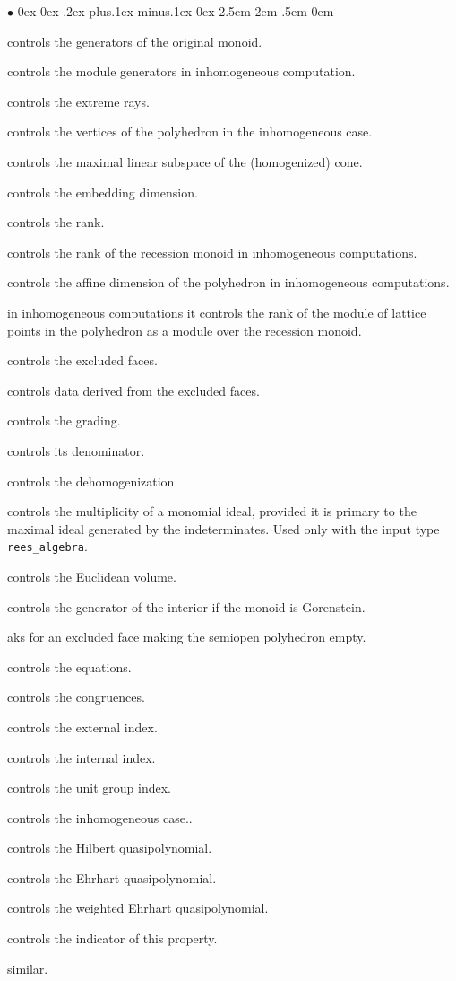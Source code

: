 \documentclass[12pt,a4paper]{scrartcl}
\newcommand{\stdli}{ \topsep0ex \partopsep0ex %
\parsep.2ex plus.1ex minus.1ex \itemsep0ex%
\leftmargin2.5em \labelwidth2em \labelsep.5em \rightmargin0em}%
\renewenvironment{itemize}{\begin{list}{{$\bullet$}}{\stdli}}{\end{list}}
\theoremstyle{definition}
\def\itemtt[#1]{\item[\textbf{\ttt{#1}}]}
\def\ttt{\texttt}
\begin{document}
\begin{itemize}
	
	\itemtt[OriginalMonoidGenerators] controls the generators of the original monoid.
	
	\itemtt[ModuleGenerators] controls the module generators in inhomogeneous computation.
	
	\itemtt[ExtremeRays] controls the extreme rays.
	
	\itemtt[VerticesOfPolyhedron] controls the vertices of the polyhedron in the inhomogeneous case.
	
	\itemtt[MaximalSubspace] controls the maximal linear subspace of the (homogenized) cone.		
	
	\itemtt [EmbeddingDim] controls the embedding dimension.
	\itemtt [Rank] controls the rank.
	
	\itemtt[RecessionRank]  controls the rank of the recession monoid in inhomogeneous computations.
	
	\itemtt[AffineDim]  controls the affine dimension of the polyhedron in inhomogeneous computations.
	
	\itemtt[ModuleRank] in inhomogeneous computations it controls the rank of the module of lattice points in the polyhedron as a module over the recession monoid. 
	
	\itemtt[ExcludedFaces] controls the excluded faces.
	
	\itemtt[InclusionExclusionData] controls data derived from the excluded faces.
	
	\itemtt[Grading] controls the grading.
	\itemtt[GradingDenom] controls its denominator.
	
	\itemtt[Dehomogenization] controls the dehomogenization.
	
	\itemtt[ReesPrimaryMultiplicity] controls the multiplicity of a monomial ideal, provided it is primary to the maximal ideal generated by the indeterminates. Used only with the input type \verb|rees_algebra|.
	
	\itemtt[EuclideanVolume]controls the Euclidean volume.
	
	\itemtt [GeneratorOfInterior] controls  the generator of the interior if the monoid is Gorenstein.
	
	\itemtt [CoveringFace] aks for an excluded face making the semiopen polyhedron empty. 
	
	\itemtt[Equations] controls the equations.
	\itemtt[Congruences] controls the congruences.
	\itemtt[ExternalIndex]  controls the external index.
	\itemtt[InternalIndex]  controls the internal index.
	\itemtt[UnitGroupIndex]  controls the unit group index.
	
	
	\itemtt[IsInhomogeneous] controls the inhomogeneous case..
	
	\itemtt[HilbertQuasiPolynomial] controls the Hilbert quasipolynomial.
	\itemtt[EhrhartQuasiPolynomial] controls the Ehrhart quasipolynomial.
	
	\itemtt[WeightedEhrhartQuasiPolynomial] controls the weighted Ehrhart quasipolynomial.
	
	\itemtt[IsTriangulationNested]  controls the indicator of this property.
	\itemtt[IsTriangulationPartial]  similar.
	
\end{itemize}
\end{document}
